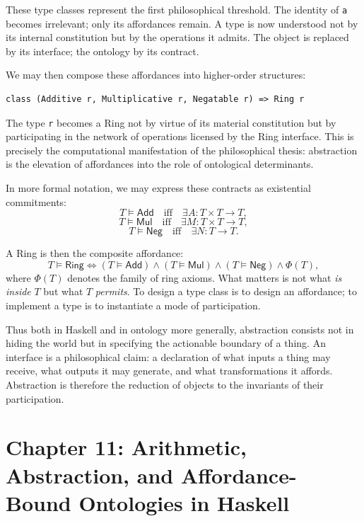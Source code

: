 \documentclass[12pt,letterpaper]{article}
\theoremstyle{remark}
\begin{document}
These type classes represent the first philosophical threshold. The identity of \texttt{a} becomes irrelevant; only its affordances remain. A type is now understood not by its internal constitution but by the operations it admits. The object is replaced by its interface; the ontology by its contract.

We may then compose these affordances into higher-order structures:
\begin{verbatim}
class (Additive r, Multiplicative r, Negatable r) => Ring r
\end{verbatim}

The type \texttt{r} becomes a Ring not by virtue of its material constitution but by participating in the network of operations licensed by the Ring interface. This is precisely the computational manifestation of the philosophical thesis: abstraction is the elevation of affordances into the role of ontological determinants.

In more formal notation, we may express these contracts as existential commitments:
\[
T \vDash \mathsf{Add} \quad \text{iff} \quad \exists A: T \times T \to T,
\]
\[
T \vDash \mathsf{Mul} \quad \text{iff} \quad \exists M: T \times T \to T,
\]
\[
T \vDash \mathsf{Neg} \quad \text{iff} \quad \exists N: T \to T.
\]

A Ring is then the composite affordance:
\[
T \vDash \mathsf{Ring} \iff 
   (T \vDash \mathsf{Add}) 
\land (T \vDash \mathsf{Mul}) 
\land (T \vDash \mathsf{Neg})
\land \Phi(T),
\]
where \(\Phi(T)\) denotes the family of ring axioms. What matters is not what \emph{is inside} \(T\) but what \(T\) \emph{permits}. To design a type class is to design an affordance; to implement a type is to instantiate a mode of participation.

Thus both in Haskell and in ontology more generally, abstraction consists not in hiding the world but in specifying the actionable boundary of a thing. An interface is a philosophical claim: a declaration of what inputs a thing may receive, what outputs it may generate, and what transformations it affords. Abstraction is therefore the reduction of objects to the invariants of their participation.

\section{Chapter 11: Arithmetic, Abstraction, and Affordance-Bound Ontologies in Haskell}
\end{document}

